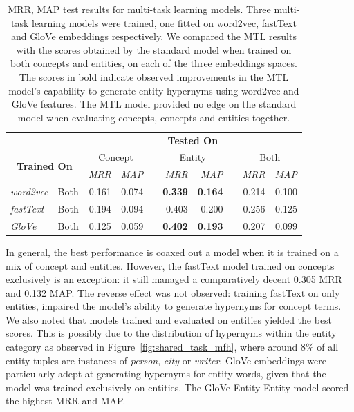 \begin{table}\centering
\begin{tabular}{@{}llrrcrrcrr@{}}\toprule
& & \multicolumn{8}{c}{\textbf{Tested On}}\\ 
\cmidrule{3-10}
\multicolumn{2}{c}{\multirow[c]{2}{*}{\textbf{Trained On}}} & \multicolumn{2}{c}{Concept} & \phantom{a} & \multicolumn{2}{c}{Entity} & \phantom{a} & \multicolumn{2}{c}{Both}\\ 
\multicolumn{2}{c}{} & \textit{MRR} & \textit{MAP} && \textit{MRR} & \textit{MAP} && \textit{MRR} & \textit{MAP}\\
\cmidrule{3-4} \cmidrule{6-7} \cmidrule{9-10}  
\textit{word2vec} & Both & 0.161 & 0.074 && \textbf{0.339} & \textbf{0.164} && 0.214 & 0.100 \\ 
\textit{fastText} & Both & 0.194 & 0.094 && 0.403 & 0.200 && 0.256 & 0.125\\ 
\textit{GloVe} & Both & 0.125 & 0.059 && \textbf{0.402} & \textbf{0.193} && 0.207 & 0.099\\ 
\bottomrule
\end{tabular}
\caption[MRR, MAP test results for multi-task learning models]{MRR, MAP test results for multi-task learning models.  Three multi-task learning models were trained, one fitted on word2vec, fastText and GloVe embeddings respectively.  We compared the MTL results with the scores obtained by the standard model when trained on both concepts and entities, on each of the three embeddings spaces.  The scores in bold indicate observed improvements in the MTL model's capability to generate entity hypernyms using word2vec and GloVe features.  The MTL model provided no edge on the standard model when evaluating concepts, concepts and entities together.}
\label{tab:semeval_mtl}
\end{table}

In general, the best performance is coaxed out a model when it is trained on a mix of concept and entities.  However, the fastText model trained on concepts exclusively is an exception: it still managed a comparatively decent 0.305 \ac{MRR} and 0.132 \ac{MAP}.  The reverse effect was not observed: training fastText on only entities, impaired the model's ability to generate hypernyms for concept terms.  We also noted that models trained and evaluated on entities yielded the best scores.  This is possibly due to the distribution of hypernyms within the entity category as observed in Figure~\ref{fig:shared_task_mfh}, where around 8\% of all entity tuples are instances of \textit{person}, \textit{city} or \textit{writer}.  GloVe embeddings were particularly adept at generating hypernyms for entity words, given that the model was trained exclusively on entities.  The GloVe Entity-Entity model scored the highest \ac{MRR} and \ac{MAP}.


